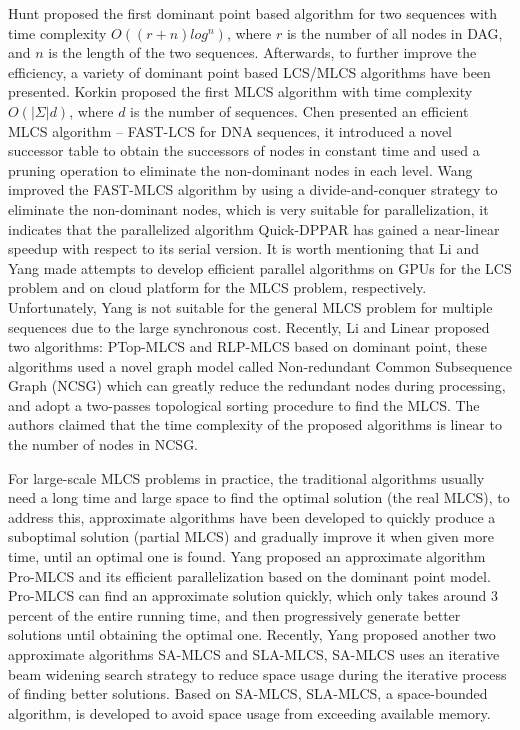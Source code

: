 \documentclass{article}
\begin{document}
Hunt \cite{Hunt1977} proposed the first dominant point based algorithm
for two sequences with time complexity $O((r+n)log^n)$, where $r$ is
the number of all nodes in DAG, and $n$ is the length of the two
sequences. Afterwards, to further improve the efficiency, a variety of
dominant point based LCS/MLCS algorithms have been presented. Korkin
\cite{Korkin2001} proposed the first MLCS algorithm with time
complexity $O(|\Sigma|d)$, where $d$ is the number of sequences. Chen
\cite{Chen2006} presented an efficient MLCS algorithm -- FAST-LCS for
DNA sequences, it introduced a novel successor table to obtain the
successors of nodes in constant time and used a pruning operation to
eliminate the non-dominant nodes in each level. Wang \cite{Wang2011}
improved the FAST-MLCS algorithm by using a divide-and-conquer
strategy to eliminate the non-dominant nodes, which is very suitable
for parallelization, it indicates that the parallelized algorithm
Quick-DPPAR has gained a near-linear speedup with respect to its
serial version. It is worth mentioning that Li \cite{Li2012} and Yang
\cite{Yang2010} made attempts to develop efficient parallel algorithms
on GPUs for the LCS problem and on cloud platform for the MLCS
problem, respectively. Unfortunately, Yang \cite{Yang2010} is not
suitable for the general MLCS problem for multiple sequences due to
the large synchronous cost. Recently, Li \cite{LiICDE} and Linear
\cite{LIKDD} proposed two algorithms: PTop-MLCS and RLP-MLCS based on
dominant point, these algorithms used a novel graph model called
Non-redundant Common Subsequence Graph (NCSG) which can greatly reduce
the redundant nodes during processing, and adopt a two-passes
topological sorting procedure to find the MLCS. The authors claimed
that the time complexity of the proposed algorithms is linear to the
number of nodes in NCSG.

For large-scale MLCS problems in practice, the traditional algorithms
usually need a long time and large space to find the optimal solution
(the real MLCS), to address this, approximate algorithms have been
developed to quickly produce a suboptimal solution (partial MLCS) and
gradually improve it when given more time, until an optimal one is
found. Yang \cite{Yang2013} proposed an approximate algorithm Pro-MLCS
and its efficient parallelization based on the dominant point
model. Pro-MLCS can find an approximate solution quickly, which only
takes around 3 percent of the entire running time, and then
progressively generate better solutions until obtaining the optimal
one. Recently, Yang \cite{Yang2014} proposed another two approximate
algorithms SA-MLCS and SLA-MLCS, SA-MLCS uses an iterative beam
widening search strategy to reduce space usage during the iterative
process of finding better solutions. Based on SA-MLCS, SLA-MLCS, a
space-bounded algorithm, is developed to avoid space usage from
exceeding available memory.
\end{document}
